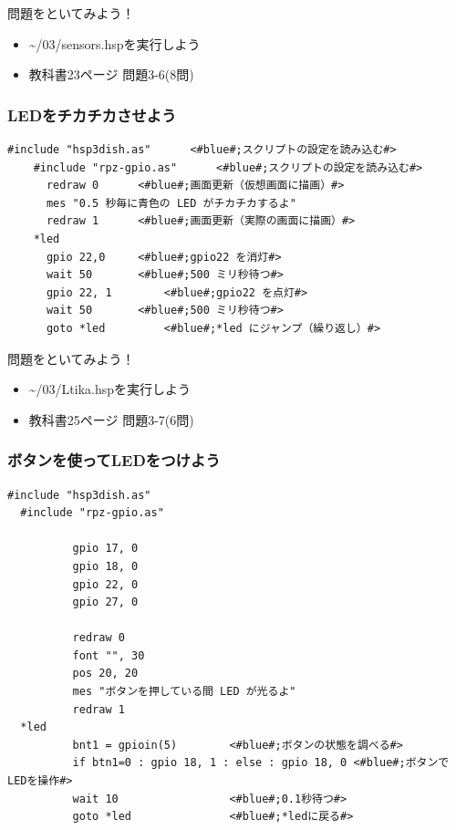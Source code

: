 \documentclass[slide03.tex]{subfiles}
\begin{document}
\begin{frame}
  \begin{exampleblock}{問題をといてみよう！}
    \begin{itemize}
      \item \sim/03/sensors.hspを実行しよう
      \item 教科書23ページ 問題3-6(8問)
    \end{itemize}
  \end{exampleblock} 
\end{frame}


\begin{frame}[fragile]
  \frametitle{LEDをチカチカさせよう}
  \begin{lstlisting}[title=\sim/03/Ltika.hsp,label=Ltika.hsp]
    #include "hsp3dish.as"		<#blue#;スクリプトの設定を読み込む#>
    #include "rpz-gpio.as"		<#blue#;スクリプトの設定を読み込む#>
      redraw 0		<#blue#;画面更新（仮想画面に描画）#>
      mes "0.5 秒毎に青色の LED がチカチカするよ"
      redraw 1		<#blue#;画面更新（実際の画面に描画）#>
    *led
      gpio 22,0		<#blue#;gpio22 を消灯#>
      wait 50 		<#blue#;500 ミリ秒待つ#>
      gpio 22, 1 		<#blue#;gpio22 を点灯#>
      wait 50 		<#blue#;500 ミリ秒待つ#>
      goto *led 		<#blue#;*led にジャンプ（繰り返し）#>
  \end{lstlisting}
\end{frame}

\begin{frame}
  \begin{exampleblock}{問題をといてみよう！}
    \begin{itemize}
      \item \sim/03/Ltika.hspを実行しよう
      \item 教科書25ページ 問題3-7(6問)
    \end{itemize}
  \end{exampleblock} 
\end{frame}

\begin{frame}[fragile]
  \frametitle{ボタンを使ってLEDをつけよう}
  \begin{lstlisting}[title=\sim/03/button\_led.hsp, label=button_led.hsp]
  #include "hsp3dish.as"
  #include "rpz-gpio.as"
  
          gpio 17, 0
          gpio 18, 0
          gpio 22, 0
          gpio 27, 0

          redraw 0
          font "", 30
          pos 20, 20
          mes "ボタンを押している間 LED が光るよ"
          redraw 1
  *led
          bnt1 = gpioin(5)        <#blue#;ボタンの状態を調べる#>
          if btn1=0 : gpio 18, 1 : else : gpio 18, 0 <#blue#;ボタンでLEDを操作#>
          wait 10                 <#blue#;0.1秒待つ#>
          goto *led               <#blue#;*ledに戻る#>
  \end{lstlisting}
\end{frame}
\end{document}
